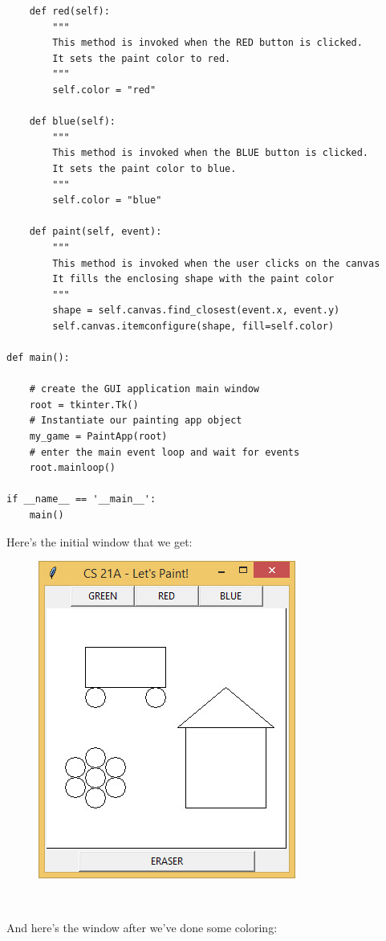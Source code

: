 \documentclass{article}
\begin{document}
\begin{lstlisting}
    def red(self):
        """
        This method is invoked when the RED button is clicked.
        It sets the paint color to red.
        """
        self.color = "red"

    def blue(self):
        """
        This method is invoked when the BLUE button is clicked.
        It sets the paint color to blue.
        """
        self.color = "blue"

    def paint(self, event):
        """
        This method is invoked when the user clicks on the canvas
        It fills the enclosing shape with the paint color
        """
        shape = self.canvas.find_closest(event.x, event.y)
        self.canvas.itemconfigure(shape, fill=self.color)

def main():

    # create the GUI application main window
    root = tkinter.Tk()
    # Instantiate our painting app object
    my_game = PaintApp(root)
    # enter the main event loop and wait for events
    root.mainloop()

if __name__ == '__main__':
    main()
\end{lstlisting}

Here's the initial window that we get:

\begin{figure}[h]
\includegraphics[scale=.6]{paint1}
\end{figure}\

And here's the window after we've done some coloring:
\end{document}

